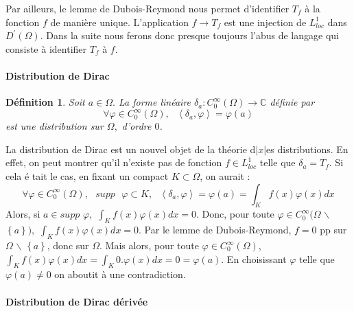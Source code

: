 \documentclass[3pt]{article}
\newtheorem{definition}[theorem]{D\'{e}finition}
\begin{document}
\bigskip 

Par ailleurs, le lemme de Dubois-Reymond nous permet d'identifier $T_{f}$ 
\`{a} la fonction $f$ de mani\`{e}re unique. L'application $f\rightarrow
T_{f}$ est une injection de $L_{loc}^{1}$ dans $D^{\prime }(\Omega )$. Dans
la suite nous ferons donc presque toujours l'abus de langage qui consiste 
\`{a} identifier $T_{f}$ \`{a} $f$.

\bigskip 

\paragraph{Distribution de Dirac}

\bigskip 

\begin{definition}
Soit $a\in \Omega .$ La forme lin\'{e}aire $\delta _{a}:C_{0}^{\infty
}(\Omega )\rightarrow \mathbb{C}$ d\'{e}finie par%
\begin{equation*}
\forall \varphi \in C_{0}^{\infty }(\Omega ),\text{ }\left\langle \delta
_{a},\varphi \right\rangle =\varphi (a)
\end{equation*}%
est une distribution sur $\Omega ,$ d'ordre $0$.
\end{definition}

\bigskip 

La distribution de Dirac est un nouvel objet de la th\'{e}orie d$\left\vert
x\right\vert $es distributions. En effet, on peut montrer qu'il n'existe pas
de fonction $f\in L_{loc}^{1}$ telle que $\delta _{a}=T_{f}$. Si cela \'{e}%
tait le cas, en fixant un compact $K\subset \Omega $, on aurait :%
\begin{equation*}
\forall \varphi \in C_{0}^{\infty }(\Omega ),\text{ }supp\text{ }\varphi
\subset K,\text{ }\left\langle \delta _{a},\varphi \right\rangle =\varphi
(a)=\int_{K}f(x)\varphi (x)dx
\end{equation*}%
Alors, si $a\in supp$ $\varphi ,$ $\int_{K}f(x)\varphi (x)dx=0$. Donc, pour
toute $\varphi \in C_{0}^{\infty }(\Omega $ $\backslash $ $\left\{ a\right\}
),$ $\int_{K}f(x)\varphi (x)dx=0.$ Par le lemme de Dubois-Reymond, $f=0$ pp
sur $\Omega $ $\backslash $ $\left\{ a\right\} $, donc sur $\Omega $. Mais
alors, pour toute $\varphi \in C_{0}^{\infty }(\Omega )$, $%
\int_{K}f(x)\varphi (x)dx=\int_{K}0.\varphi (x)dx=0=\varphi (a)$. En
choisissant $\varphi $ telle que $\varphi (a)\neq 0$ on aboutit \`{a} une
contradiction.

\bigskip 

\paragraph{Distribution de Dirac d\'{e}riv\'{e}e}
\end{document}
